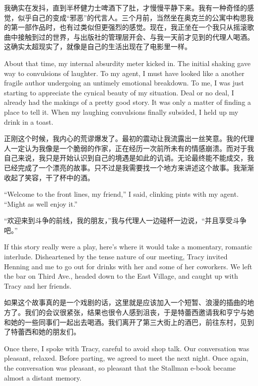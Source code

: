 \ifdefined\chs
我确实在发抖，直到半杯健力士啤酒下了肚，才慢慢平静下来。我有一种奇怪的感觉，似乎自己的变成“邪恶”的代言人。三个月前，当然坐在奥克兰的公寓中构思我的第一部作品时，也有过类似但更强烈的感觉。现在，我正坐在一个我只从摇滚歌曲中接触到过的世界，与出版社的管理层开会、与我一天前才见到的代理人喝酒。这确实太超现实了，就像是自己的生活出现在了电影里一样。
\fi

\ifdefined\eng
About that time, my internal absurdity meter kicked in. The initial shaking gave way to convulsions of laughter. To my agent, I must have looked like a another fragile author undergoing an untimely emotional breakdown. To me, I was just starting to appreciate the cynical beauty of my situation. Deal or no deal, I already had the makings of a pretty good story. It was only a matter of finding a place to tell it. When my laughing convulsions finally subsided, I held up my drink in a toast.
\fi

\ifdefined\chs
正刚这个时候，我内心的荒谬爆发了。最初的震动让我流露出一丝笑意。我的代理人一定认为我像是一个脆弱的作家，正在经历一次前所未有的情感崩溃。而对于我自己来说，我只是开始认识到自己的境遇是如此的讥诮。无论最终能不能成交，我已经完成了一个漂亮的故事。只不过是我需要找一个地方来讲述这个故事。我渐渐收起了笑容，干了杯中的酒。
\fi

\ifdefined\eng
``Welcome to the front lines, my friend,'' I said, clinking pints with my agent. ``Might as well enjoy it.''
\fi

\ifdefined\chs
“欢迎来到斗争的前线，我的朋友，”我与代理人一边碰杯一边说，“并且享受斗争吧。”
\fi

\ifdefined\eng
If this story really were a play, here's where it would take a momentary, romantic interlude. Disheartened by the tense nature of our meeting, Tracy invited Henning and me to go out for drinks with her and some of her coworkers. We left the bar on Third Ave., headed down to the East Village, and caught up with Tracy and her friends.
\fi

\ifdefined\chs
如果这个故事真的是一个戏剧的话，这里就是应该加入一个短暂、浪漫的插曲的地方了。我们的会议很紧张，结果也很令人感到沮丧，于是特蕾西邀请我和亨宁与她和她的一些同事们一起出去喝酒。我们离开了第三大街上的酒巴，前往东村，见到了特蕾西和她的朋友们。
\fi

\ifdefined\eng
Once there, I spoke with Tracy, careful to avoid shop talk. Our conversation was pleasant, relaxed. Before parting, we agreed to meet the next night. Once again, the conversation was pleasant, so pleasant that the Stallman e-book became almost a distant memory.
\fi

